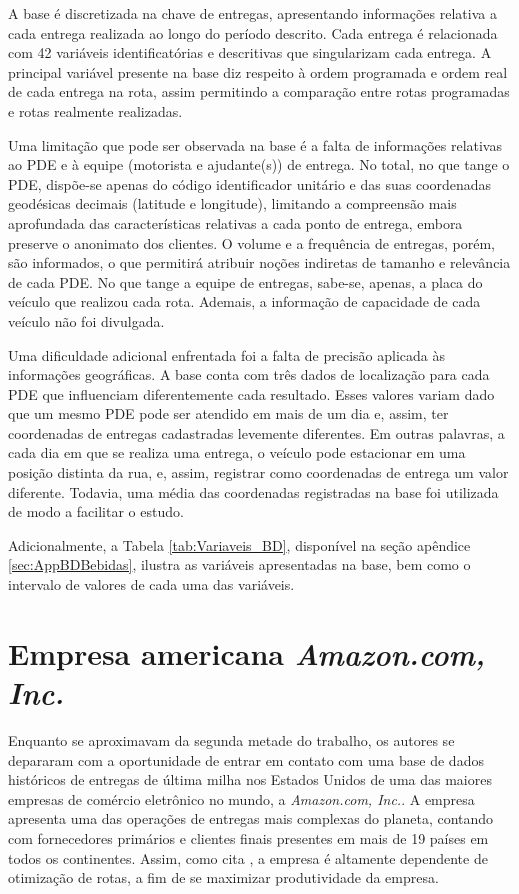 A base é discretizada na chave de entregas, apresentando informações relativa a cada entrega realizada ao longo do período descrito.
Cada entrega é relacionada com 42 variáveis identificatórias e descritivas que singularizam cada entrega.
A principal variável presente na base diz respeito à ordem programada e ordem real de cada entrega na rota, assim permitindo a comparação entre rotas programadas e rotas realmente realizadas.

Uma limitação que pode ser observada na base é a falta de informações relativas ao PDE e à equipe (motorista e ajudante(s)) de entrega.
No total, no que tange o PDE, dispõe-se apenas do código identificador unitário e das suas coordenadas geodésicas decimais (latitude e longitude), limitando a compreensão mais aprofundada das características relativas a cada ponto de entrega, embora preserve o anonimato dos clientes.
O volume e a frequência de entregas, porém, são informados, o que permitirá atribuir noções indiretas de tamanho e relevância de cada PDE. 
No que tange a equipe de entregas, sabe-se, apenas, a placa do veículo que realizou cada rota.
Ademais, a informação de capacidade de cada veículo não foi divulgada.

Uma dificuldade adicional enfrentada foi a falta de precisão aplicada às informações geográficas.
A base conta com três dados de localização para cada PDE que influenciam diferentemente cada resultado.
Esses valores variam dado que um mesmo PDE pode ser atendido em mais de um dia e, assim, ter coordenadas de entregas cadastradas levemente diferentes.
Em outras palavras, a cada dia em que se realiza uma entrega, o veículo pode estacionar em uma posição distinta da rua, e, assim, registrar como coordenadas de entrega um valor diferente. 
Todavia, uma média das coordenadas registradas na base foi utilizada de modo a facilitar o estudo. 

Adicionalmente, a Tabela \ref{tab:Variaveis_BD}, disponível na seção apêndice \ref{sec:AppBDBebidas}, ilustra as variáveis apresentadas na base, bem como o intervalo de valores de cada uma das variáveis.

\section{Empresa americana \textit{Amazon.com, Inc.}}

Enquanto se aproximavam da segunda metade do trabalho, os autores se depararam com a oportunidade de entrar em contato com uma base de dados históricos de entregas de última milha nos Estados Unidos de uma das maiores empresas de comércio eletrônico no mundo, a \textit{Amazon.com, Inc.}.
A empresa apresenta uma das operações de entregas mais complexas do planeta, contando com fornecedores primários e clientes finais presentes em mais de 19 países em todos os continentes. Assim, como cita , a empresa é altamente dependente de otimização de rotas, a fim de se maximizar produtividade da empresa.

